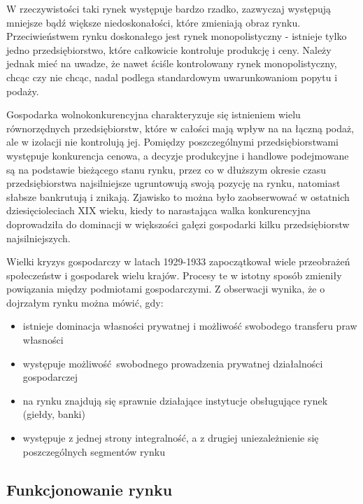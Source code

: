 \documentclass[12pt]{extarticle}
\begin{document}
W rzeczywistości taki rynek występuje bardzo rzadko, zazwyczaj występują mniejsze bądź większe niedoskonałości, które zmieniają obraz rynku. Przeciwieństwem rynku doskonałego jest rynek monopolistyczny - istnieje tylko jedno przedsiębiorstwo, które całkowicie kontroluje produkcję i ceny. Należy jednak mieć na uwadze, że nawet ściśle kontrolowany rynek monopolistyczny, chcąc czy nie chcąc, nadal podlega standardowym uwarunkowaniom popytu i podaży.

Gospodarka wolnokonkurencyjna charakteryzuje się istnieniem wielu równorzędnych przedsiębiorstw, które w całości mają wpływ na na łączną podaż, ale w izolacji nie kontrolują jej. Pomiędzy poszczególnymi przedsiębiorstwami występuje konkurencja cenowa, a decyzje produkcyjne i handlowe podejmowane są na podstawie bieżącego stanu rynku, przez co w dłuższym okresie czasu przedsiębiorstwa najsilniejsze ugruntowują swoją pozycję na rynku, natomiast słabsze bankrutują i znikają. Zjawisko to można było zaobserwować w ostatnich dziesięcioleciach XIX wieku, kiedy to narastająca walka konkurencyjna doprowadziła do dominacji w większości gałęzi gospodarki kilku przedsiębiorstw najsilniejszych.

Wielki kryzys gospodarczy w latach 1929-1933 zapoczątkował wiele przeobrażeń społeczeństw i gospodarek wielu krajów. Procesy te w istotny sposób zmieniły powiązania między podmiotami gospodarczymi. Z obserwacji wynika, że o dojrzałym rynku można mówić, gdy:

\begin{itemize}
	\item istnieje dominacja własności prywatnej i możliwość swobodego transferu praw własności
	\item występuje możliwość swobodnego prowadzenia prywatnej działalności gospodarczej
    \item na rynku znajdują się sprawnie działające instytucje obsługujące rynek (giełdy, banki)
    \item występuje z jednej strony integralność, a z drugiej uniezależnienie się poszczególnych segmentów rynku
\end{itemize}


\subsection{Funkcjonowanie rynku}
\end{document}
